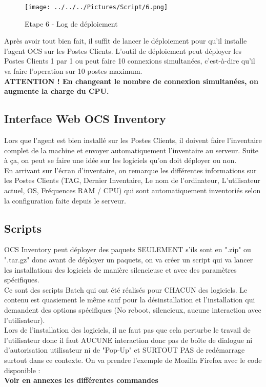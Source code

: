 \documentclass[11pt,a4paper,oneside]{article}
\begin{document}
\begin{figure}[hbtp]
\centering
\texttt{[image: ../../../Pictures/Script/6.png]}
\caption{Etape 6 - Log de déploiement}
\end{figure}

Après avoir tout bien fait, il suffit de lancer le déploiement pour qu'il installe l'agent OCS sur les Postes Clients. L'outil de déploiement peut déployer les Postes Clients 1 par 1 ou peut faire 10 connexions simultanées, c'est-à-dire qu'il va faire l'operation sur 10 postes maximum. \\ 
\textbf{ATTENTION ! En changeant le nombre de connexion simultanées, on augmente la charge du CPU.}
\newpage
\subsection{Interface Web OCS Inventory}
Lors que l'agent est bien installé sur les Postes Clients, il doivent faire l'inventaire complet de la machine et envoyer automatiquement l'inventaire au serveur. Suite à ça, on peut se faire une idée sur les logiciels qu'on doit déployer ou non. \\

En arrivant sur l'écran d'inventaire, on remarque les différentes informations sur les Postes Clients (TAG, Dernier Inventaire, Le nom de l'ordinateur, L'utilisateur actuel, OS, Fréquences RAM / CPU) qui sont automatiquement inventoriés selon la configuration faite depuis le serveur.
\subsection{Scripts}

OCS Inventory peut déployer des paquets SEULEMENT s'ils sont en ".zip" ou ".tar.gz" donc avant de déployer un paquets, on va créer un script qui va lancer les installations des logiciels de manière silencieuse et avec des paramètres spécifiques.
\\	
Ce sont des scripts Batch qui ont été réalisés pour CHACUN des logiciels. Le contenu est quasiement le même sauf pour la désinstallation et l'installation qui demandent des options spécifiques (No reboot, silencieux, aucune interaction avec l'utilisateur).
\\
Lors de l'installation des logiciels, il ne faut pas que cela perturbe le travail de l'utilisateur donc il faut AUCUNE interaction donc pas de boîte de dialogue ni d'autorisation utilisateur ni de "Pop-Up" et SURTOUT PAS de redémarrage surtout dans ce contexte.
\newpage
On va prendre l'exemple de Mozilla Firefox avec le code disponible :
\\
\textbf{Voir en annexes les différentes commandes}
  
\end{document}
